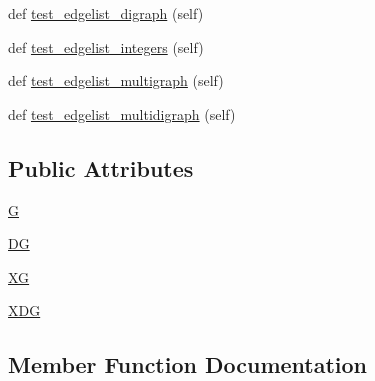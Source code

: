 \begin{DoxyCompactItemize}
\item 
def \hyperlink{classnetworkx_1_1readwrite_1_1tests_1_1test__edgelist_1_1TestEdgelist_a5fead0b145dc59138d220387f8ec039f}{test\+\_\+edgelist\+\_\+digraph} (self)
\item 
def \hyperlink{classnetworkx_1_1readwrite_1_1tests_1_1test__edgelist_1_1TestEdgelist_a645a4720392e275885b600ee862b09cf}{test\+\_\+edgelist\+\_\+integers} (self)
\item 
def \hyperlink{classnetworkx_1_1readwrite_1_1tests_1_1test__edgelist_1_1TestEdgelist_ac16ac23f7234da0542cf674f9d4ee3cd}{test\+\_\+edgelist\+\_\+multigraph} (self)
\item 
def \hyperlink{classnetworkx_1_1readwrite_1_1tests_1_1test__edgelist_1_1TestEdgelist_ae53579b4f419764b8844bcbdc5fa5d59}{test\+\_\+edgelist\+\_\+multidigraph} (self)
\end{DoxyCompactItemize}
\subsection*{Public Attributes}
\begin{DoxyCompactItemize}
\item 
\hyperlink{classnetworkx_1_1readwrite_1_1tests_1_1test__edgelist_1_1TestEdgelist_ac25be1c836c5d7733041fc63fb378fa8}{G}
\item 
\hyperlink{classnetworkx_1_1readwrite_1_1tests_1_1test__edgelist_1_1TestEdgelist_aee25580b967feb9010923026f59c1c79}{DG}
\item 
\hyperlink{classnetworkx_1_1readwrite_1_1tests_1_1test__edgelist_1_1TestEdgelist_a1e2774b0340ac15ba2ef7d727dfb8364}{XG}
\item 
\hyperlink{classnetworkx_1_1readwrite_1_1tests_1_1test__edgelist_1_1TestEdgelist_a0481391a4e26d1c156d1e249f148bf92}{X\+DG}
\end{DoxyCompactItemize}


\subsection{Member Function Documentation}
\mbox{\label{classnetworkx_1_1readwrite_1_1tests_1_1test__edgelist_1_1TestEdgelist_a50d20017db601b8d93ed3372e9848e97}} 
